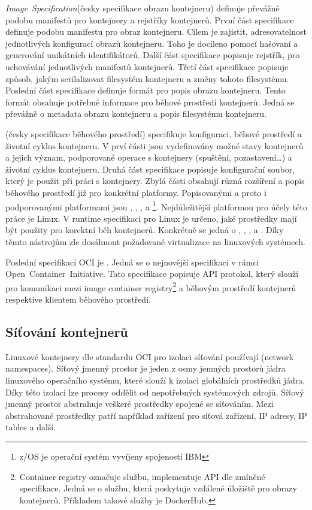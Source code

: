 \textit{Image~Specification}(česky specifikace obrazu kontejneru) definuje převážně podobu manifestů pro kontejnery a rejstříky kontejnerů.
První část specifikace definuje podobu manifestu pro obraz kontejneru. Cílem je zajistit, adresovatelnost jednotlivých konfigurací obrazů kontejneru. Toho je docíleno pomocí hašovaní a generování unikátních identifikátorů. Další část specifikace popisuje rejstřík, pro uchovávání jednotlivých manifestů kontejnerů. Třetí část specifikace popisuje způsob, jakým serilalizovat filesystém kontejneru a změny tohoto filesystému. Poslední část specifikace definuje formát pro popis obrazu kontejneru. Tento formát obsahuje potřebné informace pro běhové prostředí kontejnerů. Jedná se převážně o metadata obrazu kontejneru a popis filesystému kontejneru.\cite{a2022_image}

(česky specifikace běhového prostředí) specifikuje konfiguraci, běhové prostředí a životní cyklus kontejneru. V prví části jsou vydefinovány možné stavy kontejnerů a jejich význam, podporované operace s kontejnery (spuštění, pozastavení\ldots) a životní cyklus kontejneru. Druhá část specifikace popisuje konfigurační soubor, který je použit při práci s kontejnery. Zbylá části obsahují různá rozšíření a popis běhového prostředí již pro konkrétní platformy. Popisovanými a proto i podporovanými platformami jsou , , ,  a \footnote{z/OS je operační systém vyvíjeny spojeností IBM}. Nejdůležitější platformou pro účely této práce je Linux. V runtime specifikaci pro Linux je určeno, jaké prostředky mají být použity pro korektní běh kontejnerů. Konkrétně se jedná o , , ,  a . Díky těmto nástrojům zle dosáhnout požadované virtualizace na linuxových systémech.\cite{a2022_open}

Poslední specifikací OCI je . Jedná se o nejnovější specifikaci v rámci Open~Container~Initiative. Tato specifikace popisuje API protokol, který slouží pro komunikaci mezi image container registry\footnote{Container registry označuje službu, implementuje API dle zmíněné specifikace. Jedná se o službu, která poskytuje vzdálené úložiště pro obrazy kontejnerů. Příkladem takové služby je DockerHub.} a běhovým prostředí kontejnerů respektive klientem běhového prostředí.\cite{a2023_open}


\subsection{Síťování kontejnerů}
Linuxové kontejnery dle standardu OCI pro izolaci síťování používají (network namespaces).
Síťový jmenný prostor je jeden z osmy jemných prostorů jádra linuxového operačního systému, které slouží k izolaci globálních prostředků jádra. Díky této izolaci lze procesy oddělit od nepotřebných systémových zdrojů. Síťový jmenný prostor abstrahuje veškeré prostředky spojené se síťováním. Mezi abstrahované prostředky patří například zařízení pro síťová zařízení, IP adresy, IP tables a další.\cite{a2022_namespaces7}\cite{a2022_network_namespaces7}

